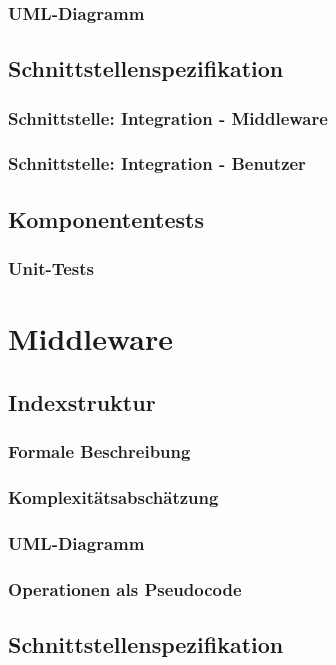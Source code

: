 \documentclass{scrartcl}
\begin{document}
\subsubsection{UML-Diagramm}
\subsection{Schnittstellenspezifikation}
\subsubsection{Schnittstelle: Integration - Middleware}
\subsubsection{Schnittstelle: Integration - Benutzer}
\subsection{Komponententests}
\subsubsection{Unit-Tests}
\newpage

\section{Middleware}
\subsection{Indexstruktur}
\subsubsection{Formale Beschreibung}
\subsubsection{Komplexitätsabschätzung}
\subsubsection{UML-Diagramm}
\subsubsection{Operationen als Pseudocode}
\subsection{Schnittstellenspezifikation}
\end{document}
